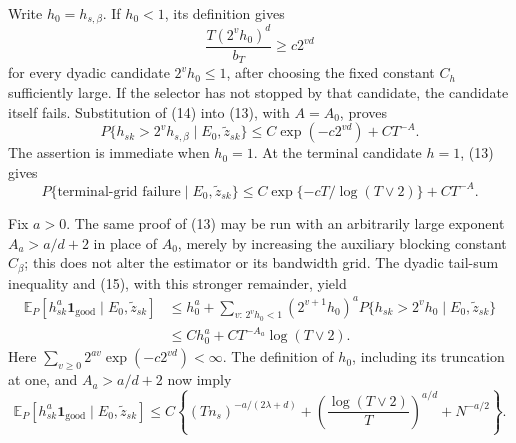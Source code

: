Write \(h_0=h_{s,\beta}\).  If \(h_0<1\), its definition gives
\[
 \frac{T(2^vh_0)^d}{b_T}
 \ge c2^{vd}
\tag{14}
\]
for every dyadic candidate \(2^vh_0\le1\), after choosing the fixed constant \(C_h\) sufficiently large.  If the selector has not stopped by that candidate, the candidate itself fails.  Substitution of (14) into (13), with \(A=A_0\), proves
\[
 P\{h_{sk}>2^vh_{s,\beta}\mid E_0,\widetilde z_{sk}\}
 \le C\exp(-c2^{vd})+CT^{-A}.
\tag{15}
\]
The assertion is immediate when \(h_0=1\).  At the terminal candidate \(h=1\), (13) gives
\[
 P\{\text{terminal-grid failure}\mid E_0,\widetilde z_{sk}\}
 \le C\exp\{-cT/\log(T\vee2)\}+CT^{-A}.
\tag{16}
\]

Fix \(a>0\).  The same proof of (13) may be run with an arbitrarily large exponent \(A_a>a/d+2\) in place of \(A_0\), merely by increasing the auxiliary blocking constant \(C_\beta\); this does not alter the estimator or its bandwidth grid.  The dyadic tail-sum inequality and (15), with this stronger remainder, yield
\[
 \begin{aligned}
 \mathbb E_P[h_{sk}^a\mathbf1_{\mathrm{good}}\mid E_0,\widetilde z_{sk}]
 &\le h_0^a
 +\sum_{v:\,2^vh_0<1}(2^{v+1}h_0)^a
 P\{h_{sk}>2^vh_0\mid E_0,\widetilde z_{sk}\}\\
 &\le Ch_0^a+CT^{-A_a}\log(T\vee2).
 \end{aligned}
\tag{17}
\]
Here \(\sum_{v\ge0}2^{av}\exp(-c2^{vd})<\infty\).  The definition of \(h_0\), including its truncation at one, and \(A_a>a/d+2\) now imply
\[
 \mathbb E_P[h_{sk}^a\mathbf1_{\mathrm{good}}\mid E_0,\widetilde z_{sk}]
 \le C\left\{
 (Tn_s)^{-a/(2\lambda+d)}
 +\left(\frac{\log(T\vee2)}T\right)^{a/d}
 +N^{-a/2}
 \right\}.
\tag{18}
\]

